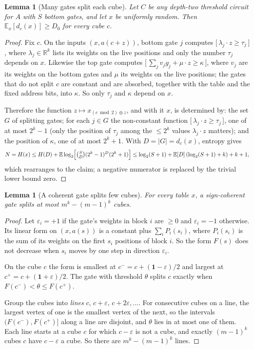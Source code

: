 \documentclass[11pt,letterpaper]{article}
\newtheorem{lemma}[theorem]{Lemma}
\theoremstyle{remark}
\newcommand{\ind}[1]{\bigl[\,#1\,\bigr]}
\begin{document}
\begin{lemma}[Many gates split each cube]\label{lem:entropy}
Let $C$ be any depth-two threshold circuit for $A$ with $S$ bottom gates, and
let $x$ be uniformly random. Then $\mathbb E_x[d_c(x)]\ge D_0$ for every cube
$c$.
\end{lemma}
\begin{proof}
Fix $c$. On the inputs $(x,a(c+z))$, bottom gate $j$ computes
$\ind{\lambda_j\cdot z\ge\tau_j}$, where $\lambda_j\in\mathbb R^k$ lists its
weights on the live positions and only the number $\tau_j$ depends on $x$.
Likewise the top gate computes
$\ind{\sum_jv_jg_j+\mu\cdot z\ge\kappa}$, where $v_j$ are its weights on the
bottom gates and $\mu$ its weights on the live positions; the gates that
do not split $c$ are constant and are absorbed, together with the table and
the fixed address bits, into $\kappa$. So only $\tau_j$ and $\kappa$ depend
on $x$.

Therefore the function $z\mapsto x_{(c\bmod2)\oplus z}$, and with it $x$, is
determined by: the set $G$ of splitting gates; for each $j\in G$ the
non-constant function $\ind{\lambda_j\cdot z\ge\tau_j}$, one of at most $2^k-1$
(only the position of $\tau_j$ among the $\le2^k$ values $\lambda_j\cdot z$
matters); and the position of $\kappa$, one of at most $2^k+1$. With
$D=|G|=d_c(x)$, entropy gives
\[
N=H(x)\le H(D)+\mathbb E\log_2\Bigl[\tbinom SD(2^k-1)^D(2^k+1)\Bigr]
\le\log_2(S+1)+\mathbb E[D]\,(\log_2(S+1)+k)+k+1,
\]
which rearranges to the claim; a negative numerator is replaced by the
trivial lower bound zero.
\end{proof}

\begin{lemma}[A coherent gate splits few cubes]\label{lem:diag}
For every table $x$, a sign-coherent gate splits at most $m^k-(m-1)^k$ cubes.
\end{lemma}
\begin{proof}
Let $\varepsilon_i=+1$ if the gate's weights in block $i$ are $\ge0$ and
$\varepsilon_i=-1$ otherwise. Its linear form on $(x,a(s))$ is a constant plus
$\sum_iP_i(s_i)$, where $P_i(s_i)$ is the sum of its weights on the first
$s_i$ positions of block $i$. So the form $F(s)$ does not decrease when
$s_i$ moves by one step in direction $\varepsilon_i$.

On the cube $c$ the form is smallest at $c^-=c+(\mathbf1-\varepsilon)/2$ and
largest at $c^+=c+(\mathbf1+\varepsilon)/2$. The gate with threshold $\theta$
splits $c$ exactly when $F(c^-)<\theta\le F(c^+)$.

Group the cubes into \emph{lines} $c,\,c+\varepsilon,\,c+2\varepsilon,\dots$.
For consecutive cubes on a line, the largest vertex of one is the smallest
vertex of the next, so the intervals $(F(c^-),F(c^+)]$ along a line are
disjoint, and $\theta$ lies in at most one of them. Each line starts at a cube
$c$ for which $c-\varepsilon$ is not a cube, and exactly $(m-1)^k$ cubes $c$
have $c-\varepsilon$ a cube. So there are $m^k-(m-1)^k$ lines.
\end{proof}
\end{document}
